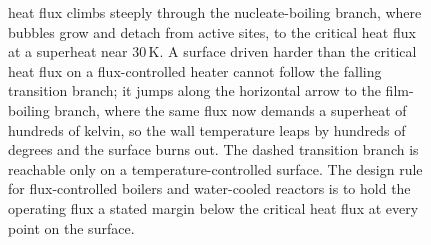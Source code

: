 \begin{figure}[htbp]
{heat flux climbs steeply through the nucleate-boiling branch, where
bubbles grow and detach from active sites, to the critical heat flux at
a superheat near $30\,\si{\kelvin}$. A surface driven harder than the
critical heat flux on a flux-controlled heater cannot follow the falling
transition branch; it jumps along the horizontal arrow to the film-
boiling branch, where the same flux now demands a superheat of hundreds
of kelvin, so the wall temperature leaps by hundreds of degrees and the
surface burns out. The dashed transition branch is reachable only on a
temperature-controlled surface. The design rule for flux-controlled
boilers and water-cooled reactors is to hold the operating flux a stated
margin below the critical heat flux at every point on the surface.}
\label{fig:vol04ch05:boiling-curve}
\end{figure}
